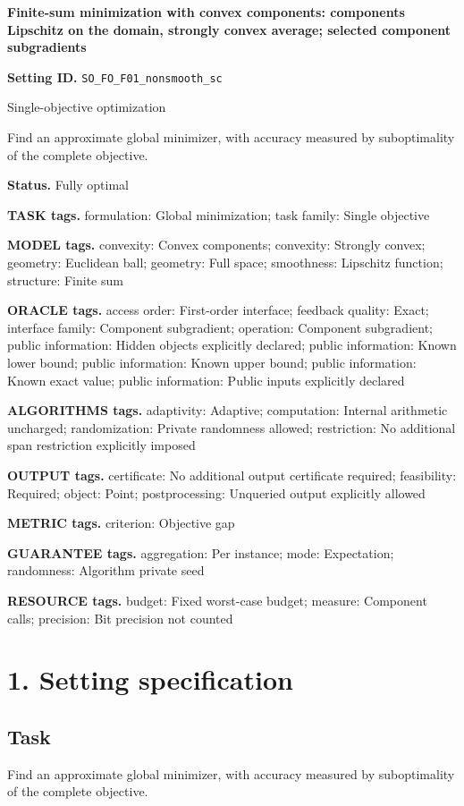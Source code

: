 \documentclass[10pt,a4paper]{article}
\begin{document}
\raggedright

{\LARGE\bfseries\sffamily\color{AtlasNavy} Finite-sum minimization with convex components: components Lipschitz on the domain, strongly convex average; selected component subgradients\par}\vspace{5pt}
\textbf{Setting ID.} \texttt{SO\_\allowbreak{}FO\_\allowbreak{}F01\_\allowbreak{}nonsmooth\_\allowbreak{}sc}

Single-objective optimization

Find an approximate global minimizer, with accuracy measured by suboptimality of the complete objective.

\textbf{Status.} Fully optimal

\textbf{TASK tags.} formulation: Global minimization; task family: Single objective

\textbf{MODEL tags.} convexity: Convex components; convexity: Strongly convex; geometry: Euclidean ball; geometry: Full space; smoothness: Lipschitz function; structure: Finite sum

\textbf{ORACLE tags.} access order: First-order interface; feedback quality: Exact; interface family: Component subgradient; operation: Component subgradient; public information: Hidden objects explicitly declared; public information: Known lower bound; public information: Known upper bound; public information: Known exact value; public information: Public inputs explicitly declared

\textbf{ALGORITHMS tags.} adaptivity: Adaptive; computation: Internal arithmetic uncharged; randomization: Private randomness allowed; restriction: No additional span restriction explicitly imposed

\textbf{OUTPUT tags.} certificate: No additional output certificate required; feasibility: Required; object: Point; postprocessing: Unqueried output explicitly allowed

\textbf{METRIC tags.} criterion: Objective gap

\textbf{GUARANTEE tags.} aggregation: Per instance; mode: Expectation; randomness: Algorithm private seed

\textbf{RESOURCE tags.} budget: Fixed worst-case budget; measure: Component calls; precision: Bit precision not counted

\section{1. Setting specification}
\subsection{Task}
Find an approximate global minimizer, with accuracy measured by suboptimality of the complete objective.
\end{document}
